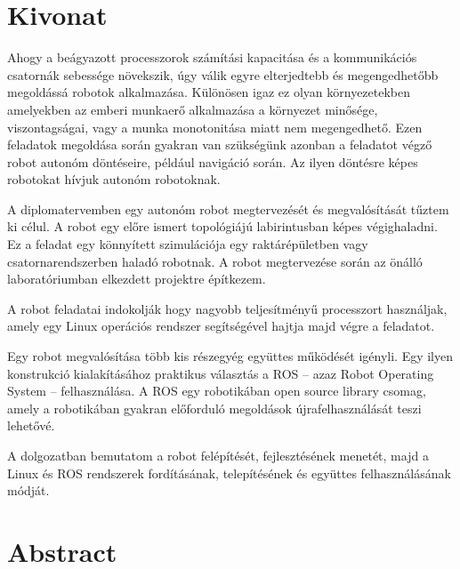 \setcounter{page}{1}

\selecthungarian

\chapter*{Kivonat}

Ahogy a beágyazott processzorok számítási kapacitása és a kommunikációs csatornák
sebessége növekszik, úgy válik egyre elterjedtebb és megengedhetőbb megoldássá
robotok alkalmazása. Különösen igaz ez olyan környezetekben amelyekben az emberi
munkaerő alkalmazása a környezet minősége, viszontagságai, vagy a munka
monotonitása miatt nem megengedhető. Ezen feladatok megoldása során gyakran van
szükségünk azonban a feladatot végző robot autonóm döntéseire, például navigáció
során. Az ilyen döntésre képes robotokat hívjuk autonóm robotoknak.

A diplomatervemben egy autonóm robot megtervezését és megvalósítását tűztem ki
célul. A robot egy előre ismert topológiájú labirintusban képes végighaladni. Ez
a feladat egy könnyített szimulációja egy raktárépületben vagy csatornarendszerben
haladó robotnak. A robot megtervezése során az önálló laboratóriumban elkezdett
projektre építkezem.

A robot feladatai indokolják hogy nagyobb teljesítményű processzort használjak,
amely egy Linux operációs rendszer segítségével hajtja majd végre a feladatot.

Egy robot megvalósítása több kis részegyég együttes működését igényli. Egy ilyen
konstrukció kialakításához praktikus választás a ROS -- azaz Robot Operating
System -- felhasználása. A ROS egy robotikában open source library csomag, amely
a robotikában gyakran előforduló megoldások újrafelhasználását teszi lehetővé.

A dolgozatban bemutatom a robot felépítését, fejlesztésének menetét, majd a
Linux és ROS rendszerek fordításának, telepítésének és együttes felhasználásának módját.

\vfill
\selectenglish


\chapter*{Abstract}

